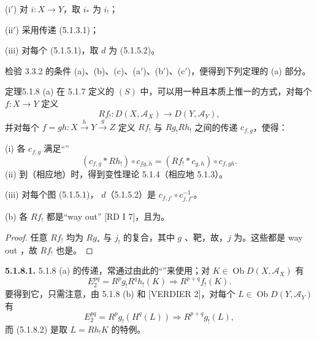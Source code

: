 (i$'$) 对 $i:X\to Y$，取 $i_*$ 为 $i_!$；

(ii$'$) 采用传递 (5.1.3.1)；

(iii) 对每个 (5.1.5.1)，取 $d$ 为 (5.1.5.2)。

检验 3.3.2 的条件 (a)、(b)、(c)、(a$'$)、(b$'$)、(c$'$)，便得到下列定理的 (a) 部分。
\begin{SGAresult}{定理}{5.1.8}
(a) 在 5.1.7 定义的 $(S)$ 中，可以用一种且本质上惟一的方式，对每个 $f:X\to Y$ 定义
\[Rf_!:D(X,\mathscr A_X)\longrightarrow D(Y,\mathscr A_Y),\]
并对每个 $f=gh:X\xrightarrow{h}Y\xrightarrow{g}Z$ 定义 $Rf_!$ 与 $Rg_!Rh_!$ 之间的传递 $c_{f,g}$，使得：

(i) 各 $c_{f,g}$ 满足“”
\[(c_{f,g}*Rh_!)\circ c_{fg,h}=(Rf_!*c_{g,h})\circ c_{f,gh}.\]
(ii) 到（相应地）时，得到变性理论 5.1.4（相应地 5.1.3）。

(iii) 对每个图 (5.1.5.1)， $d$（5.1.5.2）是 $c_{f,j'}\circ c_{j,f'}^{-1}$。

(b) 各 $Rf_!$ 都是“way out” [RD I 7]，且为。
\end{SGAresult}
\begin{proof}
任意 $Rf_!$ 均为 $Rg_*$ 与 $j_!$ 的复合，其中 $g$ 、靶，故，$j$ 为。这些都是 way out ，故 $Rf_!$ 也是。
\end{proof}
\textbf{5.1.8.1.} 5.1.8 (a) 的传递，常通过由此的“”来使用；对 $K\in\operatorname{Ob}D(X,\mathscr A_X)$ 有
\[E_2^{pq}=R^pg_!R^qh_!(K)\Longrightarrow R^{p+q}f_!(K).\tag{5.1.8.2}\]
要得到它，只需注意，由 5.1.8 (b) 和 [VERDIER 2]，对每个 $L\in\operatorname{Ob}D(Y,\mathscr A_Y)$ 有
\[E_2^{pq}=R^pg_!(H^q(L))\Longrightarrow R^{p+q}g_!(L),\tag{5.1.8.3}\]
而 (5.1.8.2) 是取 $L=Rh_!K$ 的特例。
